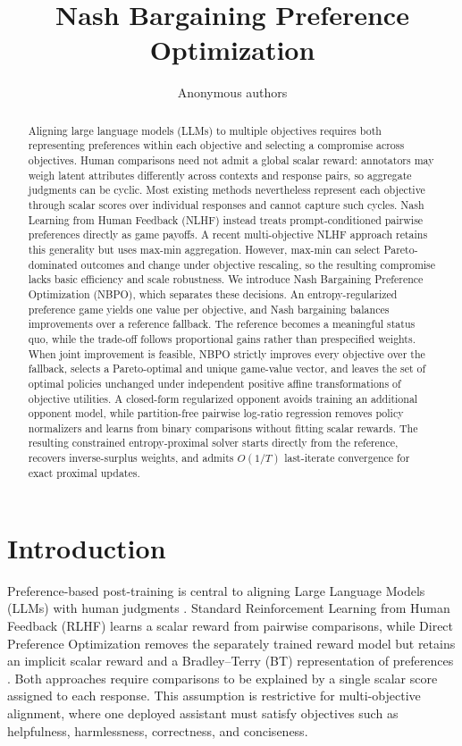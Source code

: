 \documentclass{article}
\title{Nash Bargaining Preference Optimization}
\author{Anonymous authors}
\theoremstyle{remark}
\theoremstyle{plain}
\begin{document}
\maketitle

\begin{abstract}
Aligning large language models (LLMs) to multiple objectives requires both representing preferences within each objective and selecting a compromise across objectives. Human comparisons need not admit a global scalar reward: annotators may weigh latent attributes differently across contexts and response pairs, so aggregate judgments can be cyclic. Most existing methods nevertheless represent each objective through scalar scores over individual responses and cannot capture such cycles. Nash Learning from Human Feedback (NLHF) instead treats prompt-conditioned pairwise preferences directly as game payoffs. A recent multi-objective NLHF approach retains this generality but uses max-min aggregation. However, max-min can select Pareto-dominated outcomes and change under objective rescaling, so the resulting compromise lacks basic efficiency and scale robustness. We introduce Nash Bargaining Preference Optimization (NBPO), which separates these decisions. An entropy-regularized preference game yields one value per objective, and Nash bargaining balances improvements over a reference fallback. The reference becomes a meaningful status quo, while the trade-off follows proportional gains rather than prespecified weights. When joint improvement is feasible, NBPO strictly improves every objective over the fallback, selects a Pareto-optimal and unique game-value vector, and leaves the set of optimal policies unchanged under independent positive affine transformations of objective utilities. A closed-form regularized opponent avoids training an additional opponent model, while partition-free pairwise log-ratio regression removes policy normalizers and learns from binary comparisons without fitting scalar rewards. The resulting constrained entropy-proximal solver starts directly from the reference, recovers inverse-surplus weights, and admits $O(1/T)$ last-iterate convergence for exact proximal updates.
\end{abstract}

\section{Introduction}
\label{sec:intro}
Preference-based post-training is central to aligning Large Language Models (LLMs) with human judgments \citep{christiano2017deep,ouyang2022training}. Standard Reinforcement Learning from Human Feedback (RLHF) learns a scalar reward from pairwise comparisons, while Direct Preference Optimization removes the separately trained reward model but retains an implicit scalar reward and a Bradley--Terry (BT) representation of preferences \citep{rafailov2023direct,bradley1952rank}. Both approaches require comparisons to be explained by a single scalar score assigned to each response. This assumption is restrictive for multi-objective alignment, where one deployed assistant must satisfy objectives such as helpfulness, harmlessness, correctness, and conciseness.
\end{document}
